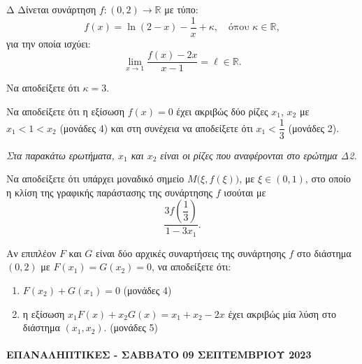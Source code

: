 \begin{thema}{Δ}
Δίνεται συνάρτηση $f: (0, 2) \to \mathbb{R}$ με τύπο:
\[
f(x) = \ln(2 - x) - \frac{1}{x} + \kappa, \quad \text{όπου } \kappa \in \mathbb{R},
\]
για την οποία ισχύει:
\[
\lim_{x \to 1} \frac{f(x) - 2x}{x - 1} = \ell \in \mathbb{R}.
\]
\begin{erwthma}
    \item Να αποδείξετε ότι $\kappa = 3$. 

    \item Να αποδείξετε ότι η εξίσωση $f(x) = 0$ έχει ακριβώς δύο ρίζες $x_1$, $x_2$ με $x_1 < 1 < x_2$ (μονάδες 4) και στη συνέχεια να αποδείξετε ότι $x_1 < \dfrac{1}{3}$ (μονάδες 2). 

    \item[\phantom{Δ0.}] \textit{Στα παρακάτω ερωτήματα, $x_1$ και $x_2$ είναι οι ρίζες που αναφέρονται στο ερώτημα Δ2.}

    \item Να αποδείξετε ότι υπάρχει μοναδικό σημείο $M\bigl(\xi, f(\xi)\bigr)$, με $\xi \in (0, 1)$, στο οποίο η κλίση της γραφικής παράστασης της συνάρτησης $f$ ισούται με
    \[
    \frac{3f\!\left(\dfrac{1}{3}\right)}{1 - 3x_1}.
    \]

    \item Αν επιπλέον $F$ και $G$ είναι δύο αρχικές συναρτήσεις της συνάρτησης $f$ στο διάστημα $(0, 2)$ με $F(x_1) = G(x_2) = 0$, να αποδείξετε ότι:
    \begin{enumerate}[label=\roman*)]
        \item $F(x_2) + G(x_1) = 0$ \hfill (μονάδες 4)
        \item η εξίσωση $x_1 F(x) + x_2 G(x) = x_1 + x_2 - 2x$ έχει ακριβώς μία λύση στο διάστημα $(x_1, x_2)$. \hfill (μονάδες 5)
    \end{enumerate}
\end{erwthma}
\end{thema}

\paragraph{ΕΠΑΝΑΛΗΠΤΙΚΕΣ - ΣΑΒΒΑΤΟ 09 ΣΕΠΤΕΜΒΡΙΟΥ 2023}

